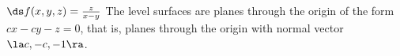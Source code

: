{$\ds f(x,y,z) = \frac{z}{x-y}$
}
{The level surfaces are planes through the origin of the form $cx-cy-z=0$, that is, planes through the origin with normal vector $\la c,-c,-1\ra$.
}